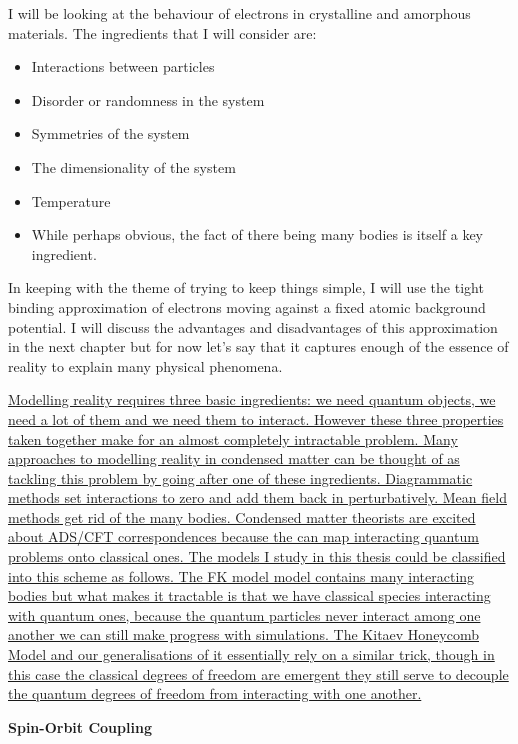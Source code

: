 I will be looking at the behaviour of electrons in crystalline and amorphous materials. The ingredients that I will consider are:

\begin{itemize}
\tightlist
\item
  Interactions between particles
\item
  Disorder or randomness in the system
\item
  Symmetries of the system
\item
  The dimensionality of the system
\item
  Temperature
\item
  While perhaps obvious, the fact of there being many bodies is itself a key ingredient.
\end{itemize}

In keeping with the theme of trying to keep things simple, I will use the tight binding approximation of electrons moving against a fixed atomic background potential. I will discuss the advantages and disadvantages of this approximation in the next chapter but for now let's say that it captures enough of the essence of reality to explain many physical phenomena.

\href{venndiagram}{Modelling reality requires three basic ingredients: we need quantum objects, we need a lot of them and we need them to interact. However these three properties taken together make for an almost completely intractable problem. Many approaches to modelling reality in condensed matter can be thought of as tackling this problem by going after one of these ingredients. Diagrammatic methods set interactions to zero and add them back in perturbatively. Mean field methods get rid of the many bodies. Condensed matter theorists are excited about ADS/CFT correspondences because the can map interacting quantum problems onto classical ones. The models I study in this thesis could be classified into this scheme as follows. The FK model model contains many interacting bodies but what makes it tractable is that we have classical species interacting with quantum ones, because the quantum particles never interact among one another we can still make progress with simulations. The Kitaev Honeycomb Model and our generalisations of it essentially rely on a similar trick, though in this case the classical degrees of freedom are emergent they still serve to decouple the quantum degrees of freedom from interacting with one another.}

\textbf{Spin-Orbit Coupling}

